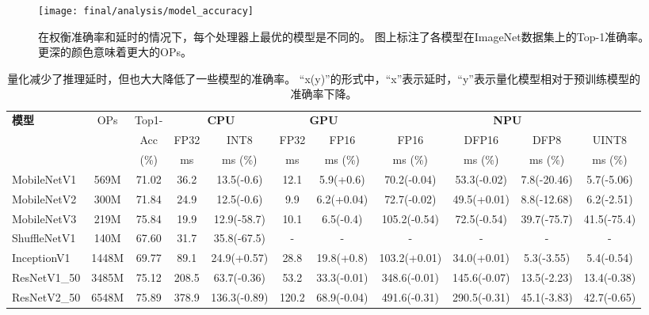 \begin{figure}[htbp]
	\centering
    \texttt{[image: final/analysis/model\_accuracy]}
    \caption{
        在权衡准确率和延时的情况下，每个处理器上最优的模型是不同的。
        图上标注了各模型在ImageNet数据集上的Top-1准确率。
        更深的颜色意味着更大的OPs。
    }
	\label{fig:model accuracy}
\end{figure}

\begin{table}[h]
	\begin{center}  
		\small
		\setlength\tabcolsep{2pt}
		\begin{tabular}	{l|c|c|cc|cc|cccc}
			\hline
			\multirow{3}{*}{\textbf{模型}}&	\multirow{3}{*}{{OPs}}&	{Top1-}&\multicolumn{2}{c|}{\textbf{CPU}} &\multicolumn{2}{c|}{\textbf{GPU}} &\multicolumn{4}{c}{\textbf{NPU}}\\
			&&Acc& FP32&INT8& FP32&FP16&FP16&DFP16&DFP8&UINT8\\
			&& (\%)& ms & ms (\%)& ms& ms (\%)& ms (\%)& ms (\%)& ms (\%)& ms (\%)\\
			
			\hline
			MobileNetV1 &569M &71.02&36.2 &13.5(-0.6)&12.1&5.9(+0.6)&70.2(-0.04)&53.3(-0.02)&7.8(-20.46)&5.7(-5.06)\\
			MobileNetV2 &300M& 71.84&24.9&12.5(-0.6)&9.9&6.2(+0.04)&72.7(-0.02)&49.5(+0.01)&8.8(-12.68)&6.2(-2.51)\\
			MobileNetV3 &219M&75.84 &19.9&12.9(-58.7)&10.1&6.5(-0.4)&105.2(-0.54)&72.5(-0.54)&39.7(-75.7)&41.5(-75.4)\\
            ShuffleNetV1 &140M&67.60&31.7&35.8(-67.5)& - & - & -& - & - & -\\
            InceptionV1 &1448M&69.77 &89.1&24.9(+0.57)&28.8&19.8(+0.8)&103.2(+0.01)&34.0(+0.01)&5.3(-3.55)&5.4(-0.54)\\
			ResNetV1\_50 &3485M&75.12 &208.5&63.7(-0.36)&53.2&33.3(-0.01)&348.6(-0.01)&145.6(-0.07)&13.5(-2.23)&13.4(-0.38)\\
			ResNetV2\_50 &6548M&75.89&378.9&136.3(-0.89)&120.2&68.9(-0.04) &491.6(-0.31)&290.5(-0.31)&45.1(-3.83)&42.7(-0.65)\\
            \hline
		\end{tabular}
	\end{center}
    \caption{
        量化减少了推理延时，但也大大降低了一些模型的准确率。
        ``x(y)''的形式中，``x''表示延时，``y''表示量化模型相对于预训练模型的准确率下降。
    }
    \label{tab:quantization accuracy latency}
\end{table}
